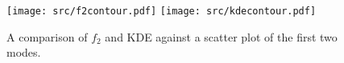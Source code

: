 \documentclass{article}
\begin{document}
\begin{figure}[h]
  \texttt{[image: src/f2contour.pdf]}
  \texttt{[image: src/kdecontour.pdf]}
\caption{A comparison of $f_2$ and KDE against a scatter plot of the
  first two modes.}
\label{fig:contour2}
\end{figure}

\begin{thebibliography}{99}


\end{thebibliography}
\end{document}
